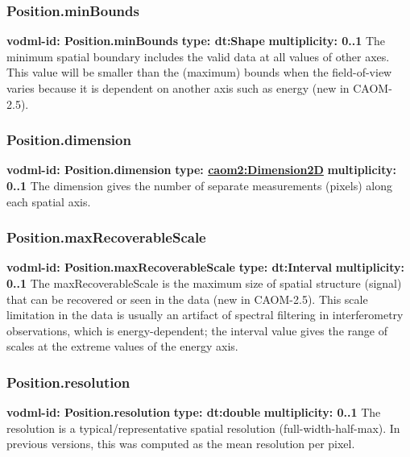     \subsubsection{Position.minBounds}
      \textbf{vodml-id: Position.minBounds} \newline
      \textbf{type: dt:Shape} \newline
      \textbf{multiplicity: 0..1} \newline
      The minimum spatial boundary includes the valid data at all values of other axes. This value will be smaller than the (maximum) bounds when the field-of-view varies because it is dependent on another axis such as energy (new in CAOM-2.5).

    \subsubsection{Position.dimension}
      \textbf{vodml-id: Position.dimension} \newline
      \textbf{type: \hyperref[sect:Dimension2D]{caom2:Dimension2D}} \newline
      \textbf{multiplicity: 0..1} \newline
      The dimension gives the number of separate measurements (pixels) along each spatial axis.

    \subsubsection{Position.maxRecoverableScale}
      \textbf{vodml-id: Position.maxRecoverableScale} \newline
      \textbf{type: dt:Interval} \newline
      \textbf{multiplicity: 0..1} \newline
      The maxRecoverableScale is the maximum size of spatial structure (signal) that can be recovered or seen in the data (new in CAOM-2.5). This scale limitation in the data is usually an artifact of spectral filtering in interferometry observations, which is energy-dependent; the interval value gives the range of scales at the extreme values of the energy axis.

    \subsubsection{Position.resolution}
      \textbf{vodml-id: Position.resolution} \newline
      \textbf{type: dt:double} \newline
      \textbf{multiplicity: 0..1} \newline
      The resolution is a typical/representative spatial resolution (full-width-half-max). In previous versions, this was computed as the mean resolution per pixel.

